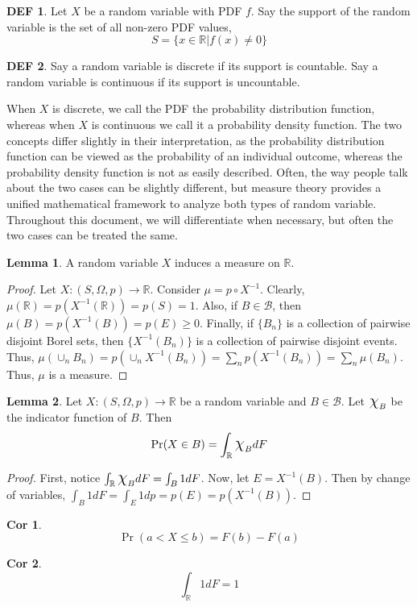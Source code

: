\documentclass{article}
\theoremstyle{definition}\newtheorem{definition}{DEF}
\theoremstyle{definition}\newtheorem{example}{Ex}
\theoremstyle{lemma}\newtheorem{lemma}{Lemma}
\theoremstyle{corrolary}\newtheorem{corrolary}{Cor}
\begin{document}
\begin{definition}
Let $X$ be a random variable with PDF $f$.
Say the support of the random variable is the set of all non-zero PDF values,
$$ S = \{ x \in \mathbb{R} | f(x) \neq 0 \}$$
\end{definition}

\begin{definition}
Say a random variable is discrete if its support is countable.
Say a random variable is continuous if its support is uncountable.
\end{definition}

When $X$ is discrete, we call the PDF the probability distribution function, whereas when $X$ is continuous we call it a probability density function.
The two concepts differ slightly in their interpretation, as the probability distribution function can be viewed as the probability of an individual outcome, whereas the probability density function is not as easily described.
Often, the way people talk about the two cases can be slightly different, but measure theory provides a unified mathematical framework to analyze both types of random variable.
Throughout this document, we will differentiate when necessary, but often the two cases can be treated the same.

\begin{lemma}
A random variable $X$ induces a measure on $\mathbb{R}$.
\end{lemma}
\begin{proof}
Let $X: (S, \Omega, p) \rightarrow \mathbb{R}$.
Consider $\mu = p \circ X^{-1}$.
Clearly, $\mu(\mathbb{R})=p(X^{-1}(\mathbb{R}))=p(S)=1$.
Also, if $B \in \mathcal{B}$, then $\mu(B)=p(X^{-1}(B))=p(E)\geq 0$.
Finally, if $\{ B_n \}$ is a collection of pairwise disjoint Borel sets, then $\{X^{-1}(B_n)\}$ is a collection of pairwise disjoint events.
Thus, $\mu(\cup_n B_n )=p(\cup_n X^{-1}(B_n))=\sum_n p(X^{-1}(B_n))=\sum_n \mu (B_n)$.
Thus, $\mu$ is a measure.
\end{proof}

\begin{lemma}
Let $X: (S, \Omega, p) \rightarrow \mathbb{R}$ be a random variable and $B \in \mathcal{B}$.
Let $ \mbox{\Large$\chi$}_B$ be the indicator function of $B$.
Then
\begin{equation}
\Pr(X\in B)=\int_\mathbb{R}  \mbox{\Large$\chi$}_B dF
\end{equation}
\end{lemma}
\begin{proof}
First, notice $\int_\mathbb{R} \mbox{\Large$\chi$}_B dF = \int_B 1 dF$.
Now, let $E=X^{-1}(B)$.
Then by change of variables, $\int_B 1 dF = \int_E 1 dp = p(E) = p(X^{-1}(B))$.
\end{proof}
\begin{corrolary}
\begin{equation}
\Pr(a < X \leq b) = F(b) - F(a)
\end{equation}
\end{corrolary}
\begin{corrolary}
\begin{equation}
\int_\mathbb{R} 1 dF = 1
\end{equation}
\end{corrolary}
\end{document}
